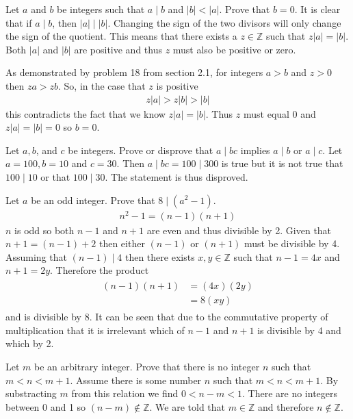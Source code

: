 \documentclass[paper=a4, fontsize=11pt]{jhwhw} %
\begin{document}
Let $a$ and $b$ be integers such that $a\mid b$ and $\lvert b \rvert < \lvert a \rvert$. Prove that $b=0$.
\solution
It is clear that if $a\mid b$, then $\lvert a \rvert \mid \lvert b \rvert$. Changing the sign of the two divisors will only change the sign of the quotient. This means that there exists a $z \in \mathbb Z$ such that $z\lvert a \rvert = \lvert b \rvert$. Both $\lvert a \rvert$ and $\lvert b \rvert$ are positive and thus $z$ must also be positive or zero. 

As demonstrated by problem 18 from section 2.1, for integers $a > b$ and $z > 0$ then $za > zb$. So, in the case that $z$ is positive
\begin{align}
z\lvert a \rvert > z\lvert b \rvert > \lvert b \rvert
\end{align}
this contradicts the fact that we know $z\lvert a \rvert = \lvert b \rvert$. Thus $z$ must equal 0 and $z\lvert a \rvert = \lvert b \rvert = 0$ so $b=0$.

Let $a,b$, and $c$ be integers. Prove or disprove that $a\mid bc$ implies $a\mid b$ or $a\mid c$.
\solution
Let $a=100,b=10$ and $c=30$. Then $a\mid bc = 100\mid 300$ is true but it is not true that $100\mid 10$ or that $100\mid 30$. The statement is thus disproved.

Let $a$ be an odd integer. Prove that $8\mid \left(a^2-1\right)$.
\solution
\begin{align}
n^2-1 = \left(n-1\right)\left(n+1\right)
\end{align}
$n$ is odd so both $n-1$ and $n+1$ are even and thus divisible by 2. Given that $n+1 = \left(n-1\right)+2$ then either $\left(n-1\right)$ or $\left(n+1\right)$ must be divisible by 4. Assuming that $\left(n-1\right)\mid 4$ then there exists  $x,y \in \mathbb Z$ such that $n-1=4x$ and $n+1=2y$. Therefore the product 
\begin{align}
\begin{split}
\left(n-1\right)\left(n+1\right) &= \left(4x\right)\left(2y\right)\\
&=8\left(xy\right)
\end{split}
\end{align}
and is divisible by 8. It can be seen that due to the commutative property of multiplication that it is irrelevant which of $n-1$ and $n+1$ is divisible by 4 and which by 2.


Let $m$ be an arbitrary integer. Prove that there is no integer $n$ such that $m<n<m+1$.
\solution
Assume there is some number $n$ such that $m<n<m+1$. By substracting $m$ from this relation we find $0<n-m<1$. There are no integers between 0 and 1 so $(n-m) \not\in \mathbb Z$. We are told that $m\in \mathbb Z$ and therefore $n\not\in \mathbb Z$.
\end{document}
